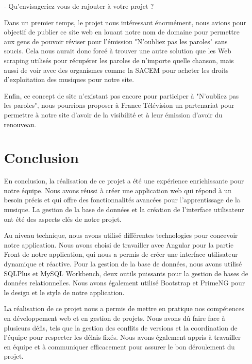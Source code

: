 \documentclass[12pt,french]{article}
\begin{document}
- Qu'envisageriez vous de rajouter à votre projet ?
\newline

Dans un premier temps, le projet nous intéressant énormément, nous avions pour objectif de publier ce site web en louant notre nom de domaine pour permettre aux gens de pouvoir réviser pour l'émission "N'oubliez pas les paroles" sans soucis. Cela nous aurait donc forcé à trouver une autre solution que les \gls{Web scraping} utilisés pour récupérer les paroles de n'importe quelle chanson, mais aussi de voir avec des organismes comme la \gls{SACEM} pour acheter les droits d'exploitation des musiques pour notre site.

Enfin, ce concept de site n'existant pas encore pour participer à "N'oubliez pas les paroles", nous pourrions proposer à France Télévision un partenariat pour permettre à notre site d'avoir de la visibilité et à leur émission d'avoir du renouveau.

\newpage
\vspace*{1cm}

\section*{Conclusion}

En conclusion, la réalisation de ce projet a été une expérience enrichissante pour notre équipe. Nous avons réussi à créer une application web qui répond à un besoin précis et qui offre des fonctionnalités avancées pour l'apprentissage de la musique. La gestion de la base de données et la création de l'interface utilisateur ont été des aspects clés de notre projet.

\medskip

Au niveau technique, nous avons utilisé différentes technologies pour concevoir notre application. Nous avons choisi de travailler avec Angular pour la partie \gls{Front} de notre application, qui nous a permis de créer une interface utilisateur dynamique et réactive. Pour la gestion de la base de données, nous avons utilisé SQLPlus et MySQL Workbench, deux outils puissants pour la gestion de bases de données relationnelles. Nous avons également utilisé Bootstrap et PrimeNG pour le design et le style de notre application.

\medskip

La réalisation de ce projet nous a permis de mettre en pratique nos compétences en développement web et en gestion de projets. Nous avons dû faire face à plusieurs défis, tels que la gestion des conflits de versions et la coordination de l'équipe pour respecter les délais fixés. Nous avons également appris à travailler en équipe et à communiquer efficacement pour assurer le bon déroulement du projet.
\end{document}
